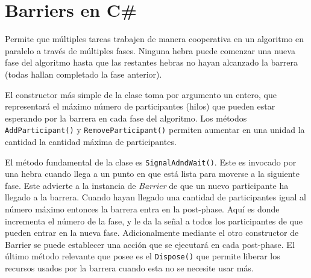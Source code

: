 \documentclass[12pt]{amsart}
\theoremstyle{definition}
\numberwithin{equation}{section}
\newcommand{\csl}[1]{\texttt{#1}}
\begin{document}
\section{Barriers en C\#}

Permite que múltiples tareas trabajen de manera cooperativa en un algoritmo en paralelo a través de múltiples fases. Ninguna hebra puede comenzar una nueva fase del algoritmo hasta que las restantes hebras no hayan alcanzado la barrera (todas hallan completado la fase anterior).

El constructor m\'as simple de la clase toma por argumento un entero, que representar\'a el m\'aximo n\'umero de participantes (hilos) que pueden estar esperando por la barrera en cada fase del algoritmo. Los m\'etodos \csl{AddParticipant()} y \csl{RemoveParticipant()} permiten aumentar en una unidad la cantidad la cantidad m\'axima de participantes. 

El m\'etodo fundamental de la clase es \csl{SignalAdndWait()}. Este es invocado por una hebra cuando llega a un punto en que est\'a lista para moverse a la siguiente fase. Este advierte a la instancia de \emph{Barrier} de que un nuevo participante ha llegado a la barrera. Cuando hayan llegado una cantidad de participantes igual al n\'umero m\'aximo entonces la barrera entra en la post-phase. Aqu\'i es donde incrementa el n\'umero de la fase, y le da la se\~nal a todos los participantes de que pueden entrar en la nueva fase. Adicionalmente mediante el otro constructor de Barrier se puede establecer una acci\'on que se ejecutar\'a en cada post-phase. El \'ultimo m\'etodo relevante que posee es el \csl{Dispose()} que permite liberar los recursos usados por la barrera cuando esta no se necesite usar m\'as. 
\end{document}
